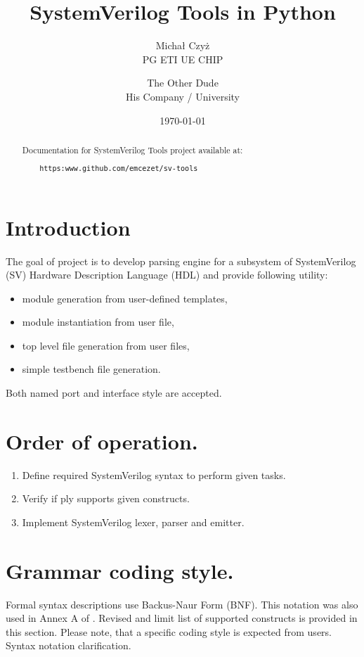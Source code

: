 \documentclass{article}
\title{SystemVerilog Tools in Python}
\author{Michał Czyż  \\
    PG ETI UE CHIP \\
    \and 
    The Other Dude \\
    His Company / University \\
    }
\date{\today}
\begin{document}
\maketitle
\tableofcontents
\newpage

\begin{abstract}
Documentation for SystemVerilog Tools project available at:
\begin{verbatim}
    https:www.github.com/emcezet/sv-tools
\end{verbatim}

\end{abstract}

\section{Introduction}
{ The goal of project is to develop parsing engine for a subsystem of SystemVerilog (SV)
Hardware Description Language (HDL) and provide following utility:
\begin{itemize}
    \item module generation from user-defined templates,
    \item module instantiation from user file,
    \item top level file generation from user files,
    \item simple testbench file generation.
\end{itemize}
Both named port and interface style are accepted. }

\section{Order of operation.}
\begin{enumerate}
    \item Define required SystemVerilog syntax to perform given tasks.
    \item Verify if ply supports given constructs.
    \item Implement SystemVerilog lexer, parser and emitter.
\end{enumerate}

\section{Grammar coding style.}
{ Formal syntax descriptions use Backus-Naur Form (BNF). This notation was also used in Annex A of \cite{standard}.
Revised and limit list of supported constructs is provided in this section. Please note, that a specific coding
style is expected from users. Syntax notation clarification. }
\end{document}
